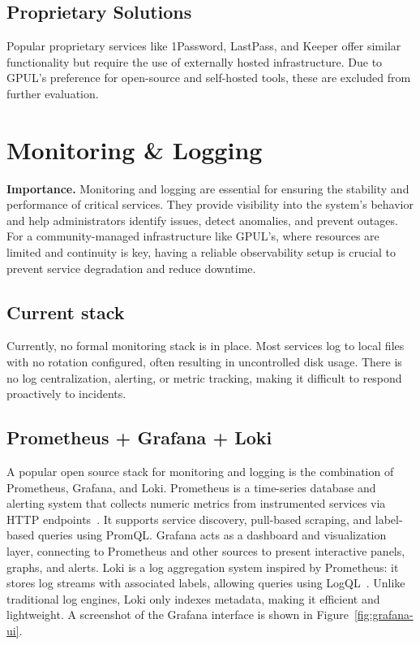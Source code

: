 \subsection{Proprietary Solutions}
Popular proprietary services like 1Password, LastPass, and Keeper offer similar functionality but require the use of externally hosted infrastructure. Due to GPUL's preference for open-source and self-hosted tools, these are excluded from further evaluation.

\section{Monitoring \& Logging}

\textbf{Importance.} Monitoring and logging are essential for ensuring the stability and performance of critical services. They provide visibility into the system's behavior and help administrators identify issues, detect anomalies, and prevent outages. For a community-managed infrastructure like GPUL's, where resources are limited and continuity is key, having a reliable observability setup is crucial to prevent service degradation and reduce downtime.

\subsection{Current stack}
Currently, no formal monitoring stack is in place. Most services log to local files with no rotation configured, often resulting in uncontrolled disk usage. There is no log centralization, alerting, or metric tracking, making it difficult to respond proactively to incidents.

\subsection{Prometheus + Grafana + Loki}
A popular open source stack for monitoring and logging is the combination of Prometheus, Grafana, and Loki. Prometheus is a time-series database and alerting system that collects numeric metrics from instrumented services via HTTP endpoints~\cite{prometheus_docs}. It supports service discovery, pull-based scraping, and label-based queries using PromQL. Grafana acts as a dashboard and visualization layer, connecting to Prometheus and other sources to present interactive panels, graphs, and alerts. Loki is a log aggregation system inspired by Prometheus: it stores log streams with associated labels, allowing queries using LogQL~\cite{loki_docs}. Unlike traditional log engines, Loki only indexes metadata, making it efficient and lightweight. A screenshot of the Grafana interface is shown in Figure~\ref{fig:grafana-ui}.

